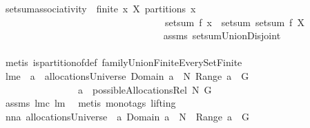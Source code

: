 \begin{isabellebody}
\endisatagproof
{\isafoldproof}%
%
\isadelimproof
\isanewline
%
\endisadelimproof
\isanewline
{}\isamarkupfalse%
\ setsum{\isacharunderscore}associativity{\isacharcolon}\ \ {\isachardoublequoteopen}finite\ x{\isachardoublequoteclose}\ {\isachardoublequoteopen}X\ partitions\ x{\isachardoublequoteclose}\ \isanewline
\ \ \ \ \ \ \ \ \ \ \ \ \ \ \ \ \ \ \ \ \ \ \ \ \ \ \ \ \ \ \ \ \ \ {\isachardoublequoteopen}setsum\ f\ x\ {\isacharequal}\ setsum\ {\isacharparenleft}setsum\ f{\isacharparenright}\ X{\isachardoublequoteclose}\ \isanewline
%
\isadelimproof
\ \ \ \ \ \ \ \ \ \ \ \ \ \ \ \ \ \ \ \ \ \ \ \ \ \ \ \ \ \ \ \ %
\endisadelimproof
%
\isatagproof
{}\isamarkupfalse%
\ assms\ setsumUnionDisjoint{}\ \isanewline
\ \ \ \ \ \ \ \ \ \ \ \ \ \ \ \ \ \ \ \ \ \ \ \ \ \ \ \ \ \ \ \ \isamarkupfalse%
\ {\isacharparenleft}metis\ is{\isacharunderscore}partition{\isacharunderscore}of{\isacharunderscore}def\ familyUnionFiniteEverySetFinite{\isacharparenright}%
\endisatagproof
{\isafoldproof}%
%
\isadelimproof
\isanewline
%
\endisadelimproof
\isanewline
{}\isamarkupfalse%
\ lm{}{}e{\isacharcolon}\ \ {\isachardoublequoteopen}a\ {\isasymin}\ allocationsUniverse{\isachardoublequoteclose}\ {\isachardoublequoteopen}Domain\ a\ {\isasymsubseteq}\ N{\isachardoublequoteclose}\ {\isachardoublequoteopen}{\isacharparenleft}{\isasymUnion}Range\ a{\isacharparenright}\ {\isacharequal}\ G{\isachardoublequoteclose}\ \isanewline
\ \ \ \ \ \ \ \ \ \ \ \ \ \ \ \ {\isachardoublequoteopen}a\ {\isasymin}\ possibleAllocationsRel\ N\ G{\isachardoublequoteclose}\ \isanewline
%
\isadelimproof
\ \ \ \ \ \ \ \ \ \ \ \ \ %
\endisadelimproof
%
\isatagproof
{}\isamarkupfalse%
\ assms\ lm{}{}c\ lm{}{}\ \isamarkupfalse%
\ {\isacharparenleft}metis\ {\isacharparenleft}mono{\isacharunderscore}tags{\isacharcomma}\ lifting{\isacharparenright}{\isacharparenright}%
\endisatagproof
{\isafoldproof}%
%
\isadelimproof
\isanewline
%
\endisadelimproof
\isanewline
{}\isamarkupfalse%
\ nn{}{}a{\isacharcolon}\ {\isachardoublequoteopen}{\isacharparenleft}allocationsUniverse\ {\isasyminter}\ {\isacharbraceleft}a{\isachardot}\ {\isacharparenleft}Domain\ a{\isacharparenright}\ {\isasymsubseteq}\ N\ {\isacharampersand}\ {\isacharparenleft}{\isasymUnion}Range\ a{\isacharparenright}\ {\isacharequal}\ G{\isacharbraceright}{\isacharparenright}\ {\isasymsubseteq}\isanewline

\end{isabellebody}
